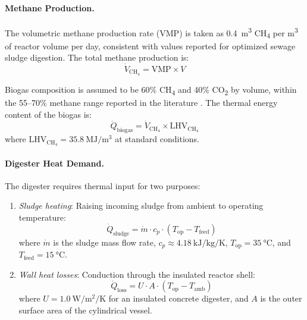 \documentclass[12pt, letterpaper]{article}
\begin{document}
\paragraph{Methane Production.}
The volumetric methane production rate (VMP) is taken as \SI{0.4}{\cubic\metre} CH\textsubscript{4} per \si{\cubic\metre} of reactor volume per day, consistent with values reported for optimized sewage sludge digestion. The total methane production is:
\begin{equation}
  \dot{V}_{\text{CH}_4} = \text{VMP} \times V
  \label{eq:ch4}
\end{equation}

Biogas composition is assumed to be 60\% CH\textsubscript{4} and 40\% CO\textsubscript{2} by volume, within the 55--70\% methane range reported in the literature \citep{nathia2018}. The thermal energy content of the biogas is:
\begin{equation}
  \dot{Q}_\text{biogas} = \dot{V}_{\text{CH}_4} \times \text{LHV}_{\text{CH}_4}
  \label{eq:q_biogas}
\end{equation}
where $\text{LHV}_{\text{CH}_4} = \SI{35.8}{\mega\joule\per\cubic\metre}$ at standard conditions.

\paragraph{Digester Heat Demand.}
The digester requires thermal input for two purposes:
\begin{enumerate}[noitemsep]
  \item \textit{Sludge heating}: Raising incoming sludge from ambient to operating temperature:
  \begin{equation}
    \dot{Q}_\text{sludge} = \dot{m} \cdot c_p \cdot (T_\text{op} - T_\text{feed})
    \label{eq:q_sludge}
  \end{equation}
  where $\dot{m}$ is the sludge mass flow rate, $c_p \approx \SI{4.18}{\kilo\joule\per\kilo\gram\per\kelvin}$, $T_\text{op} = \SI{35}{\celsius}$, and $T_\text{feed} = \SI{15}{\celsius}$.

  \item \textit{Wall heat losses}: Conduction through the insulated reactor shell:
  \begin{equation}
    \dot{Q}_\text{loss} = U \cdot A \cdot (T_\text{op} - T_\text{amb})
    \label{eq:q_loss}
  \end{equation}
  where $U = \SI{1.0}{\watt\per\square\metre\per\kelvin}$ for an insulated concrete digester, and $A$ is the outer surface area of the cylindrical vessel.
\end{enumerate}
\end{document}

